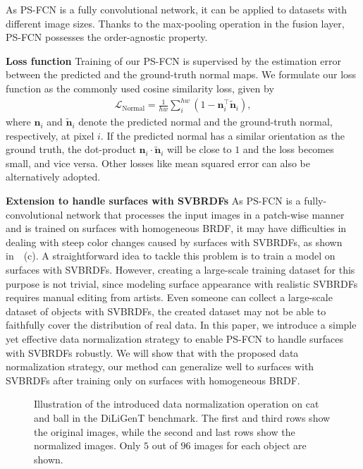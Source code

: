\documentclass[10pt,journal,compsoc]{IEEEtran}
\newcommand{\vn}{\boldsymbol{n}}
\renewcommand{\paragraph}[1]{\vspace{0.2em}\noindent \textbf{#1 \hspace{0.2em}}}
\begin{document}
As PS-FCN is a fully convolutional network, it can be applied to datasets with different image sizes. Thanks to the max-pooling operation in the fusion layer, PS-FCN possesses the order-agnostic property. 

\paragraph{Loss function}
Training of our PS-FCN is supervised by the estimation error between the predicted and the ground-truth normal maps. We formulate our loss function as the commonly used cosine similarity loss, given by
\begin{align}
    \label{eq:normal}
    \mathcal{L}_{\text{Normal}} = \frac{1}{hw} \sum_{i}^{hw} \left(1 - \vn_i^\top \tilde{\vn}_{i} \right),
\end{align}
where $\vn_{i}$ and $\tilde{\vn}_{i}$ denote the predicted normal and the ground-truth normal, respectively, at pixel $i$.
If the predicted normal has a similar orientation as the ground truth, the dot-product $\vn_{i} \cdot \tilde{\vn}_{i}$ will be close to $1$ and the loss becomes small, and vice versa. Other losses like mean squared error can also be alternatively adopted.

\paragraph{Extension to handle surfaces with SVBRDFs}
As PS-FCN is a fully-convolutional network that processes the input images in a patch-wise manner and is trained on surfaces with homogeneous BRDF, it may have difficulties in dealing with steep color changes caused by surfaces with SVBRDFs, as shown in~~(c).
A straightforward idea to tackle this problem is to train a model on surfaces with SVBRDFs. However, creating a large-scale training dataset for this purpose is not trivial, since modeling surface appearance with realistic SVBRDFs requires manual editing from artists.
Even someone can collect a large-scale dataset of objects with SVBRDFs, the created dataset may not be able to faithfully cover the distribution of real data. 
In this paper, we introduce a simple yet effective data normalization strategy to enable PS-FCN to handle surfaces with SVBRDFs robustly. We will show that with the proposed data normalization strategy, our method can generalize well to surfaces with SVBRDFs after training only on surfaces with homogeneous BRDF.

\begin{figure}[t] \centering
    
    \caption{Illustration of the introduced data normalization operation on {\sc cat} and {\sc ball} in the DiLiGenT benchmark. The first and third rows show the original images, while the second and last rows show the normalized images. Only $5$ out of $96$ images for each object are shown.} \label{fig:normalization_SVBRDF}
\end{figure}
\end{document}
